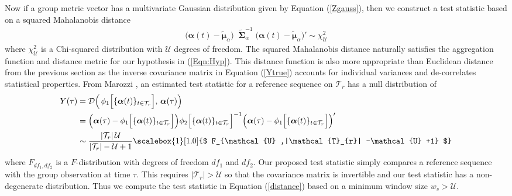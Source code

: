 Now if a group metric vector has a multivariate Gaussian distribution given by Equation (\ref{Zgauss}), then we construct a test statistic based on a squared Mahalanobis distance  
\begin{align}
 \Big (  {\boldsymbol \alpha}(t)    - \tilde{\boldsymbol \mu}_\alpha \Big) \; \;\tilde{ \boldsymbol \Sigma}_\alpha^{-1} \; \Big ( {\boldsymbol \alpha}(t) - \tilde{\boldsymbol \mu}_\alpha \Big)' \sim   \chi^2_\mathcal{U} \label{Ytrue}
\end{align} 
where $\chi^2_\mathcal{U} $ is a Chi-squared distribution with $\mathcal{U}$ degrees of freedom.  %
The squared Mahalanobis distance naturally satisfies the aggregation function and distance metric for our hypothesis in (\ref{Eqn:Hyp}). {   This distance function is also more appropriate than Euclidean distance from the previous section as the inverse covariance matrix in Equation (\ref{Ytrue}) accounts for individual variances and de-correlates statistical properties. }
 From Marozzi \cite{marozzi2016}, an estimated test statistic for a reference sequence  on $\mathcal{T}_r$  has a null distribution of
\begin{align}  
 Y(\tau)&=\mathcal{D}\Big(\, \phi_1 \Big[\{ {\boldsymbol \alpha}(t)   \}_{t \in \mathcal{T}_{r}}  \Big]  , \, {\boldsymbol \alpha}(\tau)    \Big) \nonumber \\
 &=
 \Big ( {\boldsymbol \alpha}(\tau)  - \phi_1 \Big[ \{ {\boldsymbol \alpha}(t)  \}_{t \in \mathcal{T}_{r}}   \Big] \Big)
 \phi_2 \Big[ \{ {\boldsymbol \alpha}(t)  \}_{t \in \mathcal{T}_{r}}   \Big]^{-1}\Big ( {\boldsymbol \alpha}(\tau) - \phi_1 \Big[ \{ {\boldsymbol \alpha}(t)  \}_{t \in \mathcal{T}_{r}}   \Big] \Big)'  \nonumber \\
 &
  \sim  \frac{|\mathcal{T}_{r}|\,\mathcal{U} }{|\mathcal{T}_{r}| - \mathcal{U}+1}
\scalebox{1}[1.0]{$ F_{\mathcal{U} ,|\mathcal{T}_{r}| -\mathcal{U} +1} $} \label{distance}  
 \end{align}
where   $ F_{df_1,df_2} $ is  a $F$-distribution with degrees of freedom $df_1$ and $df_2$.  Our proposed test statistic simply compares a reference sequence with the group observation at time $\tau$. 
This requires $|\mathcal{T}_{r}| >\mathcal{U}$ so that  the covariance matrix is invertible and our test statistic has a non-degenerate distribution. 
  Thus we compute the test statistic in Equation (\ref{distance})  based on a minimum window size $w_s > \mathcal{U}$.  
  
